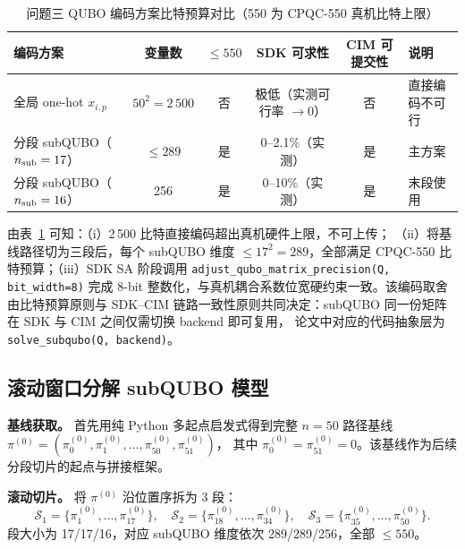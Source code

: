 \documentclass[UTF8,12pt,a4paper]{ctexart}
\begin{document}
\begin{table}[H]
  \centering
  \caption{问题三 QUBO 编码方案比特预算对比（550 为 CPQC-550 真机比特上限）}
  \label{tab:q3-budget}
  \footnotesize
  \begin{tabular}{lccccl}
    \toprule
    编码方案 & 变量数 & $\le 550$ & SDK 可求性 & CIM 可提交性 & 说明 \\
    \midrule
    全局 one-hot $x_{i,p}$              & $50^{2}=2\,500$ & 否 & 极低（实测可行率 $\to 0$） & 否    & 直接编码不可行 \\
    分段 subQUBO（$n_{\rm sub}=17$）     & $\le 289$       & 是 & 0--2.1\%（实测）           & 是    & 主方案 \\
    分段 subQUBO（$n_{\rm sub}=16$）     & 256             & 是 & 0--10\%（实测）            & 是    & 末段使用 \\
    \bottomrule
  \end{tabular}
\end{table}

由表~\ref{tab:q3-budget} 可知：（i）2\,500 比特直接编码超出真机硬件上限，不可上传；
（ii）将基线路径切为三段后，每个 subQUBO 维度 $\le 17^{2}=289$，全部满足 CPQC-550
比特预算；（iii）SDK SA 阶段调用 \texttt{adjust\_qubo\_matrix\_precision(Q, bit\_width=8)}
完成 8-bit 整数化，与真机耦合系数位宽硬约束一致。该编码取舍由比特预算原则与 SDK--CIM
链路一致性原则共同决定：subQUBO 同一份矩阵在 SDK 与 CIM 之间仅需切换 backend 即可复用，
论文中对应的代码抽象层为 \texttt{solve\_subqubo(Q, backend)}。

\subsection{滚动窗口分解 subQUBO 模型}
\label{subsec:q3-decomp}

\textbf{基线获取。} 首先用纯 Python 多起点启发式得到完整 $n=50$ 路径基线
$\pi^{(0)} = (\pi_0^{(0)},\pi_1^{(0)},\dots,\pi_{50}^{(0)},\pi_{51}^{(0)})$，
其中 $\pi_0^{(0)}=\pi_{51}^{(0)}=0$。该基线作为后续分段切片的起点与拼接框架。

\textbf{滚动切片。} 将 $\pi^{(0)}$ 沿位置序拆为 3 段：
\begin{equation}
\label{eq:q3-segments}
\mathcal{S}_1 = \{\pi_1^{(0)},\dots,\pi_{17}^{(0)}\},\quad
\mathcal{S}_2 = \{\pi_{18}^{(0)},\dots,\pi_{34}^{(0)}\},\quad
\mathcal{S}_3 = \{\pi_{35}^{(0)},\dots,\pi_{50}^{(0)}\}.
\end{equation}
段大小为 17/17/16，对应 subQUBO 维度依次 289/289/256，全部 $\le 550$。
\end{document}
